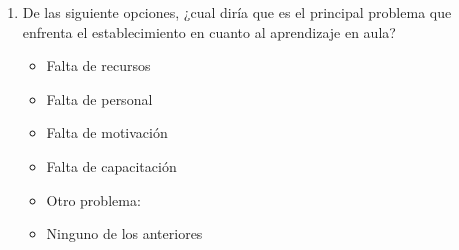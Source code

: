 \documentclass{article}
\begin{document}
\begin{enumerate}
        \underline{\hspace{0.95\linewidth}} \vspace{0.3cm} \\
        \underline{\hspace{0.95\linewidth}} \vspace{0.3cm}
    \item De las siguiente opciones, ¿cual diría que es el principal problema que enfrenta el establecimiento en cuanto al aprendizaje en aula? 
    \begin{itemize}[label=$\square$]
        \item Falta de recursos
        \item Falta de personal
        \item Falta de motivación
        \item Falta de capacitación
        \item Otro problema: \underline{\hspace{0.5\linewidth}}
        \item Ninguno de los anteriores
    \end{itemize}
\end{enumerate}

\newpage
\end{document}
